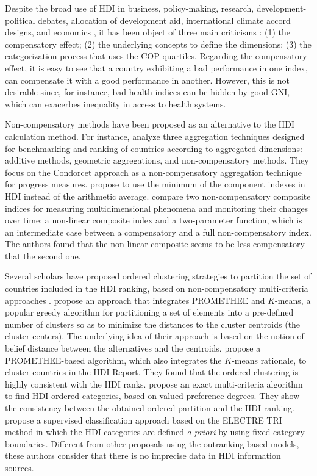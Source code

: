 \documentclass[]{elsarticle}
\theoremstyle{definition}
\begin{document}
Despite the broad use of HDI  in business, policy-making, research, development-political debates, allocation of development aid, international climate accord designs, and economics \citep{Wolff2011}, it has been object of three main criticisms \citep{Noorbakhsh1998, Berenger2007, Klugman2011, Martinez2013}: (1) the compensatory effect; (2) the underlying concepts to define the dimensions; (3) the categorization process that uses the COP quartiles.  Regarding the compensatory effect, it is easy to see that a country exhibiting a bad performance in one index, can compensate it with a good performance in another. However, this is not desirable since, for instance, bad health indices can be hidden by good GNI, which can exacerbes inequality in access to health systems.   

Non-compensatory  methods have been proposed as an alternative to the HDI calculation method. For instance, \cite{Natoli2011} analyze three aggregation techniques designed for benchmarking and ranking of countries according to aggregated dimensions: additive methods, geometric aggregations, and non-compensatory methods.  They focus on the Condorcet approach as a non-compensatory aggregation technique for progress measures.  \cite{Lozano2009} propose to use the minimum of the component indexes in HDI instead of the arithmetic average. \cite{Mazziotta2015} compare two non-compensatory composite indices for measuring multidimensional phenomena and monitoring their changes over time: a non-linear composite index and a two-parameter function, which is an intermediate case between a compensatory and a full non-compensatory index. The authors found that the non-linear composite seems to be less compensatory that the second one.

Several scholars have proposed  ordered clustering strategies to partition the set of countries included in the HDI ranking,  based on non-compensatory multi-criteria approaches \citep{DeSmet2014}.   \cite{Boujelben2016} propose an approach that integrates PROMETHEE and $K$-means, a popular greedy algorithm for partitioning a set of elements into a pre-defined number of clusters so as to minimize the distances to the cluster centroids (the cluster centers). The underlying idea of their approach is based on the notion of belief distance between the alternatives and the centroids. \cite{Chen2018} propose a PROMETHEE-based algorithm, which also integrates the $K$-means rationale, to cluster countries in the HDI Report. They found that the ordered clustering is highly consistent with the HDI ranks. \cite{DeSmet2012} propose an exact multi-criteria algorithm to find HDI ordered categories, based on valued preference degrees.  They show the consistency between the obtained ordered partition and the HDI ranking.  \cite{Monteiro2018} propose a supervised classification approach based on the ELECTRE TRI method in which the HDI categories are defined \emph{a priori} by using fixed category boundaries. Different from other proposals using the outranking-based models, these authors consider that there is no imprecise data in HDI information sources. 
\end{document}
